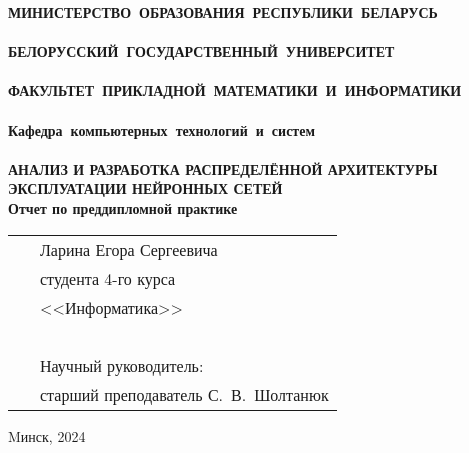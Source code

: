 \setcounter{page}{1}
\thispagestyle{empty}
\begin{center}
\bf
\vspace{4cm}
{
\mbox{МИНИСТЕРСТВО~ОБРАЗОВАНИЯ~РЕСПУБЛИКИ~БЕЛАРУСЬ} \\~\\
\mbox{БЕЛОРУССКИЙ~ГОСУДАРСТВЕННЫЙ~УНИВЕРСИТЕТ} \\~\\
\mbox{ФАКУЛЬТЕТ~ПРИКЛАДНОЙ~МАТЕМАТИКИ~И~ИНФОРМАТИКИ} \\~\\
\mbox{Кафедра~компьютерных~технологий~и~систем} \\~\\
}
\vspace{4cm}
\bf
АНАЛИЗ И РАЗРАБОТКА РАСПРЕДЕЛЁННОЙ АРХИТЕКТУРЫ ЭКСПЛУАТАЦИИ НЕЙРОННЫХ СЕТЕЙ\\
\vspace{1cm}
\rm Отчет по преддипломной практике
\vspace{3cm}
\end{center}
\begin{tabular}{ll}
\hspace{10.5cm}
&Ларина Егора Сергеевича~\\
&студента 4-го курса\\
&<<Информатика>>\\~\\
&Научный руководитель:\\
&старший преподаватель С.~В.~Шолтанюк
\end{tabular}
\vspace{4cm}
\begin{center}
Mинск, 2024
\end{center}
\clearpage
\restoregeometry